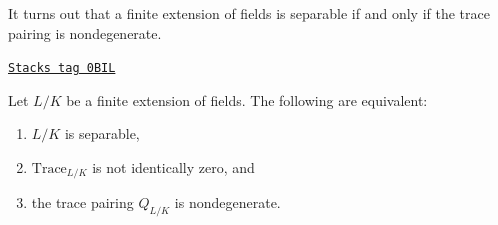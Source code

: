 It turns out that a finite extension of fields is separable if and only
if the trace pairing is nondegenerate.

\begin{lemma}
\label{fields-lemma-separable-trace-pairing}
\href{https://stacks.math.columbia.edu/tag/0BIL}{\texttt{Stacks tag 0BIL}}

Let $L/K$ be a finite extension of fields. The following are equivalent:
\begin{enumerate}
\item $L/K$ is separable,
\item $\text{Trace}_{L/K}$ is not identically zero, and
\item the trace pairing $Q_{L/K}$ is nondegenerate.
\end{enumerate}
\end{lemma}

